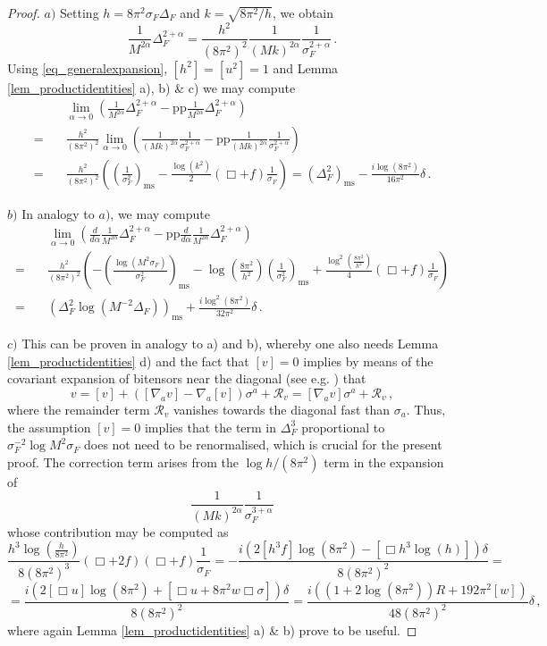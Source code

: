 \documentclass[a4paper,10pt,twoside]{article}
\numberwithin{equation}{section}
\newcounter{and}
\def\R{\mathcal{R}}
\def\pp{\mathrm{pp}}
\def\ms{\mathrm{ms}}
\theoremstyle{plain}
\theoremstyle{definition}
\begin{document}
\begin{proof}
$a)$ Setting $h=8\pi^2\sigma_F \Delta_F$ and $k=\sqrt{8\pi^2/h}$, we obtain
%
$$\frac{1}{M^{2\alpha}}\Delta_F^{2+\alpha}=\frac{h^2}{(8\pi^2)^2}\frac{1}{(Mk)^{2\alpha}}\frac{1}{\sigma_F^{2+\alpha}}\,.$$ 
%
Using \eqref{eq_generalexpansion}, $[h^2]=[u^2]=1$ and Lemma \ref{lem_productidentities} a), b) \& c) we may compute
%
\begin{align*}&\lim_{\alpha\to 0}\left(\frac{1}{M^{2\alpha}}\Delta_F^{2+\alpha}-\pp\frac{1}{M^{2\alpha}}\Delta_F^{2+\alpha}\right)\\
%
=\quad&\frac{h^2}{(8\pi^2)^2}\lim_{\alpha\to 0}\left(\frac{1}{(Mk)^{2\alpha}}\frac{1}{\sigma_F^{2+\alpha}}-\pp\frac{1}{(Mk)^{2\alpha}}\frac{1}{\sigma_F^{2+\alpha}}\right)\\
%
=\quad&\frac{h^2}{(8\pi^2)^2} \left(\left(\frac{1}{\sigma^2_F}\right)_\ms-\frac{\log (k^2)}{2}\left(\Box + f\right)\frac{1}{\sigma_F}\right)=(\Delta^2_F)_\ms-\frac{i\log(8\pi^2)}{16\pi^2}\delta\,.\end{align*}

$b)$ In analogy to $a)$, we may compute
%
\begin{align*}&\lim_{\alpha\to 0}\left(\frac{d}{d\alpha}\frac{1}{M^{2\alpha}}\Delta_F^{2+\alpha}-\pp\frac{d}{d\alpha}\frac{1}{M^{2\alpha}}\Delta_F^{2+\alpha}\right)\\
%
=\quad&\frac{h^2}{(8\pi^2)^2} \left(-\left(\frac{\log \left(M^2 \sigma_F\right)}{\sigma^2_F}\right)_\ms-\log\left(\frac{8\pi^2}{h^2}\right)\left(\frac{1}{\sigma^2_F}\right)_\ms+\frac{\log^2 \left(\frac{8\pi^2}{h^2}\right)}{4}\left(\Box + f\right)\frac{1}{\sigma_F}\right)\\
%
=\quad &\left(\Delta^2_F\log \left(M^{-2}\Delta_F\right)\right)_\ms+\frac{i\log^2(8\pi^2)}{32\pi^2}\delta\,.\end{align*}
 
$c)$ This can be proven in analogy to a) and b), whereby one also needs Lemma \ref{lem_productidentities} d) and the fact that $[v]=0$ implies by means of the covariant expansion of bitensors near the diagonal (see e.g. \cite[Section 5]{Poisson:2011nh}) that 
$$v=[v]+([\nabla_a v]-\nabla_a[v])\sigma^a+\R_v=[\nabla_a v]\sigma^a+\R_v\,,$$
where the remainder term $\R_v$ vanishes towards the diagonal fast than $\sigma_a$. Thus, the assumption $[v]=0$ implies that the term in $\Delta^3_F$ proportional to $\sigma^{-2}_F \log M^2\sigma_F$ does not need to be renormalised, which is crucial for the present proof. The correction term arises from the  $\log h/(8\pi^2)$ term in the expansion of $$\frac{1}{(Mk)^{2\alpha}}\frac{1}{\sigma_F^{3+\alpha}}$$ whose contribution may be computed as
%
$$\frac{h^3 \log\left( \frac{h}{8\pi^2}\right)}{8(8\pi^2)^3}(\Box+2f)(\Box+f)\frac{1}{\sigma_F}=-\frac{i\left(2[h^3 f]\log(8\pi^2)-[\Box h^3 \log (h)]\right)\delta}{8(8\pi^2)^2}=$$
%
$$=\frac{i\left(2[\Box u]\log(8\pi^2)+[\Box u + 8\pi^2 w\Box \sigma]\right)\delta}{8(8\pi^2)^2}=\frac{i\left((1+2\log(8\pi^2))R+192\pi^2[w]\right)}{48(8\pi^2)^2}\delta\,,$$
%
where again Lemma \ref{lem_productidentities} a) \& b) prove to be  useful.
\end{proof}
\end{document}
